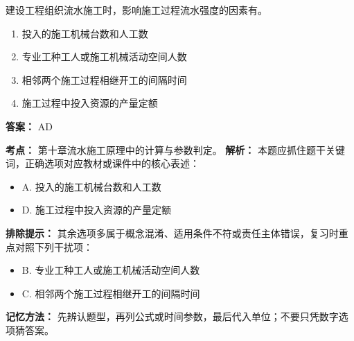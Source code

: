 \documentclass[UTF8,fontset=fandol,11pt]{ctexart}
\begin{document}
\begin{quizbox}[title={第 19 题}]
建设工程组织流水施工时，影响施工过程流水强度的因素有。\\
\begin{enumerate}[label=\Alph*.]
\item 投入的施工机械台数和人工数
\item 专业工种工人或施工机械活动空间人数
\item 相邻两个施工过程相继开工的间隔时间
\item 施工过程中投入资源的产量定额
\end{enumerate}
\textbf{答案：} AD
\vspace{0.25em}
\begin{answerbox}[title={考点解析}]
\textbf{考点：} 第十章流水施工原理中的计算与参数判定。
\textbf{解析：} 本题应抓住题干关键词，正确选项对应教材或课件中的核心表述：
\begin{itemize}
\item A. 投入的施工机械台数和人工数
\item D. 施工过程中投入资源的产量定额
\end{itemize}
\textbf{排除提示：} 其余选项多属于概念混淆、适用条件不符或责任主体错误，复习时重点对照下列干扰项：
\begin{itemize}
\item B. 专业工种工人或施工机械活动空间人数
\item C. 相邻两个施工过程相继开工的间隔时间
\end{itemize}
\textbf{记忆方法：} 先辨认题型，再列公式或时间参数，最后代入单位；不要只凭数字选项猜答案。
\end{answerbox}
\end{quizbox}

\vspace{0.2em}
\end{document}
